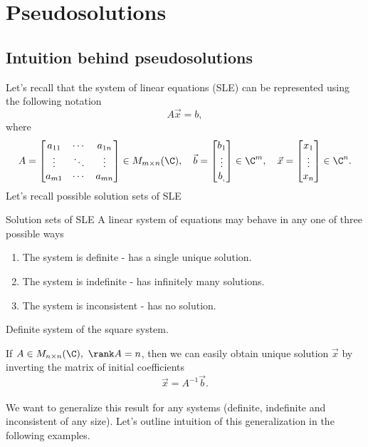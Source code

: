 \setcounter{section}{1}

\section{Pseudosolutions}
\subsection*{Intuition behind pseudosolutions}
    \par 
    Let's recall that the system of linear equations (SLE) can be represented using the following notation
    \[
        A\vec{x} = b,
    \]
    where
    \[
        A = 
            \begin{bmatrix}
                a_{11} & \cdots & a_{1n}\\
                \vdots & \ddots & \vdots\\
                a_{m1} & \cdots & a_{mn} 
            \end{bmatrix}
        \in M_{m\times n}(\C), \quad 
        \vec{b} = \begin{bmatrix}  b_1 \\\vdots \\b_,\end{bmatrix} \in \C^m, \quad
        \vec{x} = \begin{bmatrix}  x_1 \\\vdots \\x_n\end{bmatrix} \in \C^n.
    \]
    Let's recall possible solution sets of SLE
    \begin{theorema}{Solution sets of SLE}
        A linear system of equations may behave in any one of three possible ways
        \begin{enumerate} 
            \item The system is definite - has a single unique solution.
            \item The system is indefinite - has infinitely many solutions.
            \item The system is inconsistent - has no solution.
        \end{enumerate}
    \end{theorema}
     \Ex Definite system of the square system.
    
        If $A \in M_{n\times n}(\C), \ \rank A = n$, then we can easily obtain unique solution $\vec{x}$ by inverting the matrix of initial coefficients
            \[
                \vec{x}  = A^{-1}\vec{b}.
            \]\\
    We want to generalize this result for any systems (definite, indefinite and inconsistent of any size). Let's outline intuition of this generalization in the following examples.
